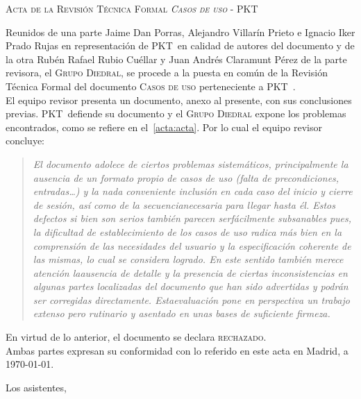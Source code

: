 \documentclass[11pt, a4paper, twoside]{article}
\newcommand*{\PKT}{P\lower2pt\hbox{K}\kern-2pt\raise2pt\hbox{T}\kern-2pt}
\begin{document}
	\begin{center}
		\scshape \large Acta de la Revisión Técnica Formal \textit{Casos de uso} - \PKT\ \vspace{.5cm}
	\end{center}

	Reunidos de una parte Jaime Dan Porras, Alejandro Villarín Prieto e Ignacio Iker Prado Rujas en representación de \PKT\ en calidad de autores del documento y de la otra Rubén Rafael Rubio Cuéllar y Juan Andrés Claramunt Pérez de la parte revisora, el \textsc{Grupo Diedral}, se procede a la puesta en común de la Revisión Técnica Formal del documento \textsc{Casos de uso} perteneciente a \PKT\ . \\

	El equipo revisor presenta un documento, anexo al presente, con sus conclusiones previas. \PKT\ defiende su documento y el \textsc{Grupo Diedral} expone los problemas encontrados, como se refiere en el~\ref{acta:acta}. Por lo cual el equipo revisor concluye:

\begin{quotation} \itshape
	El documento adolece de ciertos problemas sistemáticos, principalmente la ausencia de un formato propio de casos de uso (falta de precondiciones, entradas\ldots) y la nada conveniente inclusión en cada caso del inicio y cierre de sesión, así como de la secuencia\break necesaria para llegar hasta él. Estos defectos si bien son serios también parecen ser\break fácilmente subsanables pues, la dificultad de establecimiento de los casos de uso radica más bien en la comprensión de las necesidades del usuario y la especificación coherente de las mismas, lo cual se considera logrado. En este sentido también merece atención la\break ausencia de detalle y la presencia de ciertas inconsistencias en algunas partes \mbox{localizadas} del documento que han sido advertidas y podrán ser corregidas directamente. Esta\break evaluación pone en perspectiva un trabajo extenso pero rutinario y asentado en unas bases de suficiente firmeza.
\end{quotation}


\noindent
En virtud de lo anterior, el documento se declara \textsc{rechazado}.\\

	Ambas partes expresan su conformidad con lo referido en este acta en Madrid, a \today.

\begin{flushleft}
	Los asistentes,
\end{flushleft}
\end{document}

